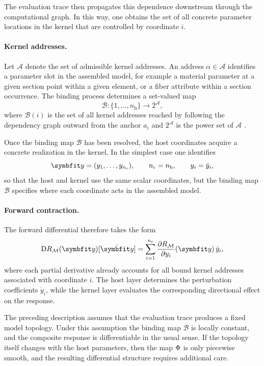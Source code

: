 The evaluation trace then propagates this dependence downstream
through the computational graph. 
In this way, one obtains the set of all concrete parameter locations in the kernel that are controlled by
coordinate \(i\).

\paragraph{Kernel addresses.}
Let \(\mathcal{A}\) denote the set of admissible kernel addresses. 
An
address \(\alpha \in \mathcal{A}\) identifies a parameter slot
in the assembled model, for example a material parameter at a given
section point within a given element, or a fiber attribute within a
section occurrence. 
The binding process determines a set-valued map
\[
\mathcal{B} : \{1,\ldots,n_{\mathrm h}\} \to 2^{\mathcal{A}},
\]
where \(\mathcal{B}(i)\) is the set of all kernel addresses reached by
following the dependency graph outward from the anchor \(a_i\) 
and \(2^{\mathcal{A}}\) is the power set of \(\mathcal{A}\) \citep{halmosNaiveSetTheory1998}.


Once the binding map \(\mathcal{B}\) has been resolved, the host
coordinates acquire a concrete realization in the kernel. 
In the
simplest case one identifies
\[
\CoreParameters = (y_1,\ldots,y_{n_{\mathrm c}}),
\qquad
n_{\mathrm c}=n_{\mathrm h},
\qquad
y_i=\hat y_i,
\]
so that the host and kernel use the same scalar coordinates, but the
binding map \(\mathcal{B}\) specifies where each coordinate acts in the
assembled model.


\paragraph{Forward contraction.}
The forward differential therefore takes the form
\[
\D \ResponseMap_{\ModelFamily}(\CoreParameters)[\dot{\CoreParameters}]
=
\sum_{i=1}^{n_{\mathrm c}}
\frac{\partial \ResponseMap_{\ModelFamily}}{\partial y_i}(\CoreParameters)\,
\dot y_i,
\]
where each partial derivative already accounts for all bound kernel
addresses associated with coordinate \(i\). The host layer determines
the perturbation coefficients \(\dot y_i\), while the kernel layer
evaluates the corresponding directional effect on the response.


\begin{remark}
The preceding description assumes that the evaluation trace produces a
fixed model topology. 
Under this assumption the binding map \(\mathcal{B}\) is locally constant, and the composite response is differentiable in the usual sense. 
If the topology itself changes with
the host parameters, then the map \(\Phi\) is only piecewise
smooth, and the resulting differential structure requires additional care.
\end{remark}